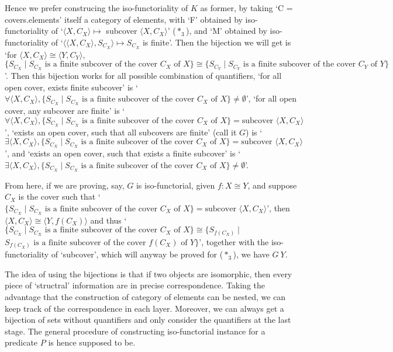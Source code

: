 \documentclass[11pt]{article}
\begin{document}
Hence we prefer construcing the iso-functoriality of $K$ as former, by taking `C = covers.elements' itself a category of elements, with `F' obtained by iso-functoriality of `$\langle X,C_X\rangle\mapsto$ subcover $\langle X,C_X\rangle$' ($*_3$), and `M' obtained by iso-functoriality of `$\langle\langle X,C_X\rangle,S_{C_X}\rangle\mapsto S_{C_X}$ is finite'. Then the bijection we will get is `for $\langle X,C_X\rangle\cong \langle Y,C_Y\rangle$, $\{S_{C_X} \mid \text{$S_{C_X}$ is a finite subcover of the cover $C_X$ of $X$}\} \cong \{S_{C_Y} \mid \text{$S_{C_Y}$ is a finite subcover of the cover $C_Y$ of $Y$}\} $'. Then this bijection works for all possible combination of quantifiers, `for all open cover, exists finite subcover' is \newline`$\forall \langle X,C_X\rangle, \{S_{C_X} \mid \text{$S_{C_X}$ is a finite subcover of the cover $C_X$ of $X$}\}\ne \emptyset$', `for all open cover, any subcover are finite' is `$\forall \langle X,C_X\rangle,\{S_{C_X} \mid \text{$S_{C_X}$ is a finite subcover of the cover $C_X$ of $X$}\} = \text{subcover $\langle X,C_X\rangle$}$', `exists an open cover, such that all subcovers are finite' (call it $G$) is \newline`$\exists \langle X,C_X\rangle, \{S_{C_X} \mid \text{$S_{C_X}$ is a finite subcover of the cover $C_X$ of $X$}\} = \text{subcover $\langle X,C_X\rangle$}$', and `exists an open cover, such that exists a finite subcover' is `$\exists \langle X,C_X\rangle,\{S_{C_X} \mid \text{$S_{C_X}$ is a finite subcover of the cover $C_X$ of $X$}\}$\newline$\ne \emptyset$'. 

From here, if we are proving, say, $G$ is iso-functorial, given $f:X\cong Y$, and suppose $C_X$ is the cover such that `$\{S_{C_X} \mid \text{$S_{C_X}$ is a finite subcover of the cover $C_X$ of $X$}\} = \text{subcover $\langle X,C_X\rangle$}$', then $\langle X,C_X\rangle\cong \langle Y,f(C_X)\rangle$ and thus `$\{S_{C_X} \mid \text{$S_{C_X}$ is a finite subcover of the cover $C_X$ of $X$}\} \cong \{S_{f(C_X)} \mid$ \newline$\text{$S_{f(C_X)}$ is a finite subcover of the cover $f(C_X)$ of $Y$}\}$', together with the iso-functoriality of `subcover', which will anyway be proved for ($*_3$), we have $G \ Y$.

The idea of using the bijections is that if two objects are isomorphic, then every piece of `structral' information are in precise correspondence. Taking the advantage that the construction of category of elements can be nested, we can keep track of the correspondence in each layer. Moreover, we can always get a bijection of sets without quantifiers and only consider the quantifiers at the last stage. The general procedure of constructing iso-functorial instance for a predicate $P$ is hence supposed to be.
\end{document}
